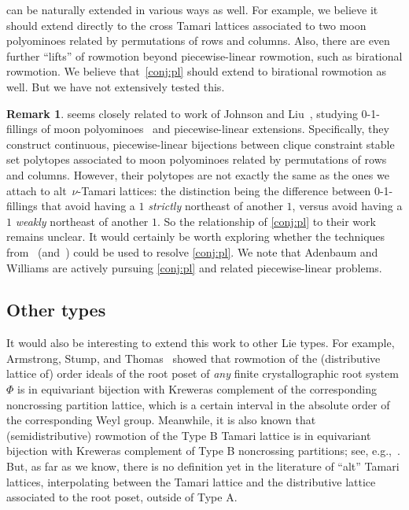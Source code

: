 \documentclass[11pt]{amsart}
\theoremstyle{definition}
\newtheorem{remark}[theorem]{Remark}
\begin{document}
 can be naturally extended in various ways as well. For example, we believe it should extend directly to the cross Tamari lattices associated to two moon polyominoes related by permutations of rows and columns. Also, there are even further ``lifts'' of rowmotion beyond piecewise-linear rowmotion, such as birational rowmotion. We believe that~\cref{conj:pl} should extend to birational rowmotion as well. But we have not extensively tested this.

\begin{remark}
 seems closely related to work of Johnson and Liu~\cite{johnson2025piecewise}, studying 0-1-fillings of moon polyominoes~\cite{rubey2011increasing} and piecewise-linear extensions. Specifically, they construct continuous, piecewise-linear bijections between clique constraint stable set polytopes associated to moon polyominoes related by permutations of rows and columns. However, their polytopes are not exactly the same as the ones we attach to alt~$\nu$-Tamari lattices: the distinction being the difference between 0-1-fillings that avoid having a $1$ \emph{strictly} northeast of another $1$, versus avoid having a $1$ \emph{weakly} northeast of another $1$. So the relationship of \cref{conj:pl} to their work remains unclear. It would certainly be worth exploring whether the techniques from~\cite{johnson2025piecewise} (and~\cite{johnson2024birational}) could be used to resolve \cref{conj:pl}. We note that Adenbaum and Williams are actively pursuing \cref{conj:pl} and related piecewise-linear problems.
\end{remark}

\subsection{Other types} 

It would also be interesting to extend this work to other Lie types. For example, Armstrong, Stump, and Thomas~\cite{armstrong2013uniform} showed that rowmotion of the (distributive lattice of) order ideals of the root poset of \emph{any} finite crystallographic root system $\Phi$ is in equivariant bijection with Kreweras complement of the corresponding noncrossing partition lattice, which is a certain interval in the absolute order of the corresponding Weyl group. Meanwhile, it is also known that (semidistributive) rowmotion of the Type B Tamari lattice is in equivariant bijection with Kreweras complement of Type B noncrossing partitions; see, e.g.,~\cite[\S1.2]{thomas2019rowmotion}. But, as far as we know, there is no definition yet in the literature of ``alt'' Tamari lattices, interpolating between the Tamari lattice and the distributive lattice associated to the root poset, outside of Type A.



\end{document}
